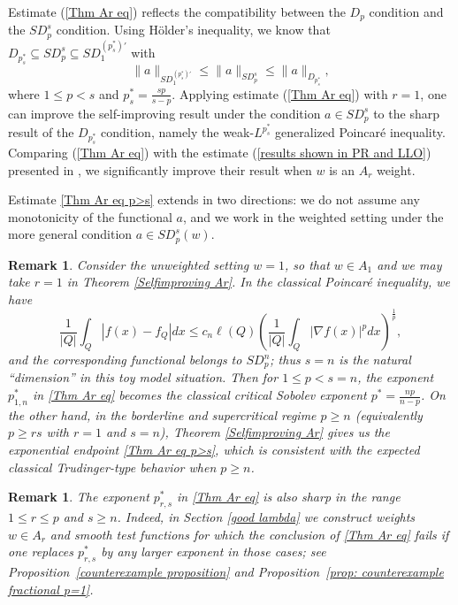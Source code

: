 \documentclass[reqno, 10pt, oneside]{amsart}
\numberwithin{equation}{section}
\newtheorem{remark}[theorem]{Remark}
\numberwithin{theorem}{section}
\newcommand{\1}{{\rm 1\hspace*{-0.4ex}%
\rule{0.1ex}{1.52ex}\hspace*{0.2ex}}}
\begin{document}
Estimate (\ref{Thm Ar eq}) reflects the compatibility between the $D_p$ condition and the $SD_p^s$ condition. Using H\"older's inequality, we know that $D_{p^*_s} \subseteq SD_p^{s} \subseteq SD_1^{(p^{*}_s)'  }$ with $$\|a\|_{SD_1^{(p^{*}_s)'  }} \le \|a\|_{SD_p^{s}} \le \|a\|_{D_{p^*_s}},$$ 
where $1 \le p < s$ and $p^*_s=\frac{sp}{s-p}$. Applying estimate (\ref{Thm Ar eq}) with $r=1$, one can improve the self-improving result under the condition $a \in SD_p^s$ to the sharp result of the $D_{p^*_s}$ condition, namely the weak-$L^{p^*_s}$ generalized Poincar\'e inequality. Comparing (\ref{Thm Ar eq}) with the estimate ({\ref{results shown in PR and LLO}}) presented in \cite{PR,LLO}, we significantly improve their result when $w$ is an $A_r$ weight. 


Estimate \eqref{Thm Ar eq p>s} extends \cite[Corollary 1.9]{PR} in two directions: we do not assume any monotonicity of the functional $a$, and we work in the weighted setting under the more general condition $a\in SD_p^s(w)$.


\begin{remark}
Consider the unweighted setting $w= 1$, so that $w\in A_1$ and we may take $r=1$ in Theorem \ref{Selfimproving Ar}. In the classical Poincaré inequality, we have 
\begin{equation*}
	\frac1{|Q|}\int_Q |f(x)-f_Q|dx \le c_n  \ell(Q)\left(\frac{1}{|Q|}\int_Q |\nabla f(x)|^pdx\right)^{\frac{1}{p}},
\end{equation*}
and the corresponding functional belongs to $SD^{n}_p$; thus $s=n$ is the natural ``dimension'' in this toy model situation. Then for $1\le p<s=n$, the exponent $p_{1,n}^{*}$ in \eqref{Thm Ar eq} becomes the classical critical Sobolev exponent $p^*=\frac{np}{n-p}$. On the other hand, in the borderline and supercritical regime $p\ge n$ (equivalently $p\ge rs$ with $r=1$ and $s=n$), Theorem \ref{Selfimproving Ar} gives us the exponential endpoint \eqref{Thm Ar eq p>s}, which is consistent with the expected classical Trudinger-type behavior when $p\ge n$. 
\end{remark}

 
 
 \begin{remark}\label{rem:sharpness-Ar}
The exponent $p_{r,s}^{*}$ in \eqref{Thm Ar eq} is also sharp in the range $1 \le r \le p$ and $s \ge n$. Indeed, in Section \ref{good lambda} we construct weights $w\in A_r$ and smooth test functions for which the conclusion of \eqref{Thm Ar eq} fails if one replaces $p_{r,s}^{*}$ by any larger exponent in those cases; see Proposition~\ref{counterexample proposition} and Proposition~\ref{prop: counterexample fractional p=1}.
\end{remark}
\end{document}
